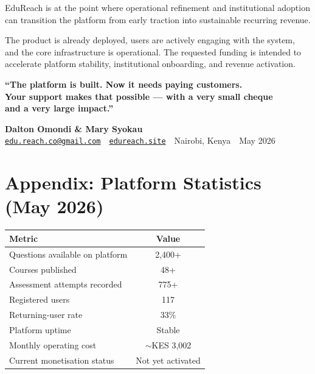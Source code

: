 \documentclass[a4paper,11pt]{article}
\begin{document}
EduReach is at the point where operational refinement and institutional adoption can transition the platform from early traction into sustainable recurring revenue.

The product is already deployed, users are actively engaging with the system, and the core infrastructure is operational. The requested funding is intended to accelerate platform stability, institutional onboarding, and revenue activation.

\vspace{0.4cm}
\begin{tcolorbox}[edureach]
\begin{center}
  \textcolor{indigobrand}{\textbf{``The platform is built. Now it needs paying customers.}}\\[4pt]
  \textcolor{indigobrand}{\textbf{Your support makes that possible — with a very small cheque}}\\
  \textcolor{indigobrand}{\textbf{and a very large impact.''}}
\end{center}
\end{tcolorbox}

\vspace{0.5cm}

\begin{center}
  \textbf{Dalton Omondi \& Mary Syokau}\\[3pt]
  \textcolor{indigobrand}{\href{mailto:edu.reach.co@gmail.com}{\texttt{edu.reach.co@gmail.com}}}
  \,\textbullet\,
  \textcolor{indigobrand}{\href{https://edureach.site}{\texttt{edureach.site}}}
  \,\textbullet\,
  Nairobi, Kenya
  \,\textbullet\,
  May 2026
\end{center}

\newpage

\section*{Appendix: Platform Statistics (May 2026)}

\begin{table}[h]
\centering
\begin{tabular}{@{}p{7cm} c@{}}
\toprule
\rowcolor{indigobg}
\textcolor{indigobrand}{\textbf{Metric}} & \textcolor{indigobrand}{\textbf{Value}} \\
\midrule
Questions available on platform   & 2,400+ \\
Courses published                 & 48+ \\
Assessment attempts recorded      & 775+ \\
Registered users                  & 117 \\
Returning-user rate               & 33\% \\
Platform uptime                   & Stable \\
Monthly operating cost            & $\sim$KES 3,002 \\
Current monetisation status       & Not yet activated \\
\bottomrule
\end{tabular}
\end{table}
\end{document}
